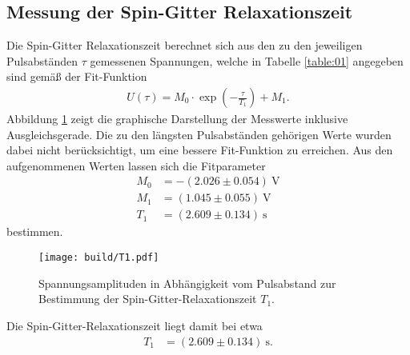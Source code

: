 \subsection{Messung der Spin-Gitter Relaxationszeit}
\noindent Die Spin-Gitter Relaxationszeit berechnet sich aus den zu den
jeweiligen Pulsabständen $\tau$ gemessenen Spannungen, welche in Tabelle
\ref{table:01} angegeben sind gemäß der Fit-Funktion
\begin{align}
  U(\tau) = M_0 \cdot \exp{\left(- \frac{\tau}{T_1}\right)} + M_1.
  \label{eqn:03}
\end{align}
\noindent Abbildung \ref{fig:01} zeigt die graphische Darstellung der Messwerte
inklusive Ausgleichsgerade. Die zu den längsten Pulsabständen gehörigen Werte
wurden dabei nicht berücksichtigt, um eine bessere Fit-Funktion zu erreichen.
Aus den aufgenommenen Werten lassen sich die Fitparameter
\begin{align*}
  M_0 &=  -(2.026  \pm  0.054) \: \si{\volt} \\
  M_1 &=  (1.045 \pm  0.055) \: \si{\volt} \\
  T_1 &=  (2.609  \pm  0.134) \: \si{\second}
\end{align*}
\noindent bestimmen.
\FloatBarrier

\FloatBarrier
\FloatBarrier
\begin{figure}
  \texttt{[image: build/T1.pdf]}
  \caption{Spannungsamplituden in Abhängigkeit vom Pulsabstand zur Bestimmung
           der Spin-Gitter-Relaxationszeit $T_1$.}
  \label{fig:01}
\end{figure}
\FloatBarrier
\noindent Die Spin-Gitter-Relaxationszeit liegt damit bei etwa
\begin{align*}
  T_1 &=  (2.609  \pm  0.134) \: \si{\second}.
\end{align*}
